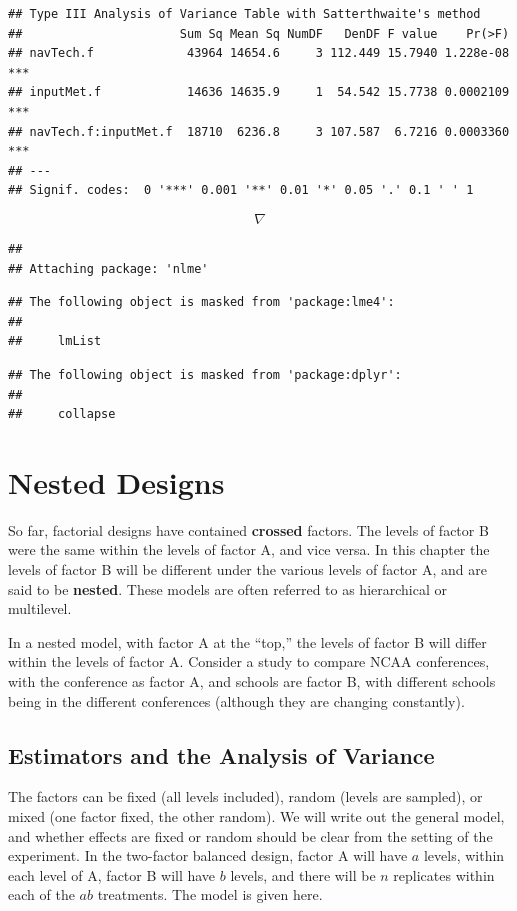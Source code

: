 \documentclass[
]{book}
\begin{document}
\begin{verbatim}
## Type III Analysis of Variance Table with Satterthwaite's method
##                      Sum Sq Mean Sq NumDF   DenDF F value    Pr(>F)    
## navTech.f             43964 14654.6     3 112.449 15.7940 1.228e-08 ***
## inputMet.f            14636 14635.9     1  54.542 15.7738 0.0002109 ***
## navTech.f:inputMet.f  18710  6236.8     3 107.587  6.7216 0.0003360 ***
## ---
## Signif. codes:  0 '***' 0.001 '**' 0.01 '*' 0.05 '.' 0.1 ' ' 1
\end{verbatim}

\[ \nabla \]

\begin{verbatim}
## 
## Attaching package: 'nlme'
\end{verbatim}

\begin{verbatim}
## The following object is masked from 'package:lme4':
## 
##     lmList
\end{verbatim}

\begin{verbatim}
## The following object is masked from 'package:dplyr':
## 
##     collapse
\end{verbatim}

\chapter{Nested Designs}\label{nested-designs}

So far, factorial designs have contained \textbf{crossed} factors. The
levels of factor B were the same within the levels of factor A, and vice
versa. In this chapter the levels of factor B will be different under
the various levels of factor A, and are said to be \textbf{nested}.
These models are often referred to as hierarchical or multilevel.

In a nested model, with factor A at the ``top,'' the levels of factor B
will differ within the levels of factor A. Consider a study to compare
NCAA conferences, with the conference as factor A, and schools are
factor B, with different schools being in the different conferences
(although they are changing constantly).

\section{Estimators and the Analysis of
Variance}\label{estimators-and-the-analysis-of-variance}

The factors can be fixed (all levels included), random (levels are
sampled), or mixed (one factor fixed, the other random). We will write
out the general model, and whether effects are fixed or random should be
clear from the setting of the experiment. In the two-factor balanced
design, factor A will have \(a\) levels, within each level of A, factor
B will have \(b\) levels, and there will be \(n\) replicates within each
of the \(ab\) treatments. The model is given here.
\end{document}
